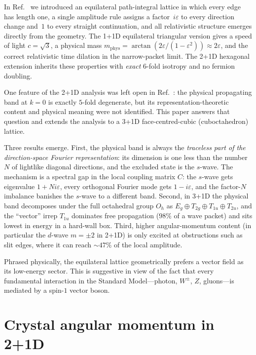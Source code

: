 \documentclass[twocolumn,showpacs,preprintnumbers,amsmath,amssymb]{revtex4-2}
\newcommand{\eps}{\varepsilon}
\newcommand{\mphys}{m_{\mathrm{phys}}}
\newcommand{\Oh}{O_{h}}
\begin{document}
In Ref.~\cite{schmiereck2026} we introduced an equilateral path-integral
lattice in which every edge has length one, a single amplitude rule
assigns a factor~$i\eps$ to every direction change and~$1$ to every straight
continuation, and all relativistic structure emerges directly from the
geometry.
The \mbox{1\!+\!1D} equilateral triangular version gives a speed of light
$c=\sqrt{3}$, a physical mass
$\mphys=\arctan(2\eps/(1-\eps^{2}))\approx 2\eps$, and the correct
relativistic time dilation in the narrow-packet limit.
The \mbox{2\!+\!1D} hexagonal extension inherits these properties with
\emph{exact} $6$-fold isotropy and no fermion doubling.

One feature of the \mbox{2\!+\!1D} analysis was left open in
Ref.~\cite{schmiereck2026}: the physical propagating band at $k=0$ is
exactly $5$-fold degenerate, but its representation-theoretic content and
physical meaning were not identified.
This paper answers that question and extends the analysis to a
\mbox{3\!+\!1D} face-centred-cubic (cuboctahedron) lattice.

Three results emerge.
First, the physical band is always the \emph{traceless part of the
direction-space Fourier representation}: its dimension is one less than
the number~$N$ of lightlike diagonal directions, and the excluded state is
the $s$-wave.
The mechanism is a spectral gap in the local coupling matrix $C$: the
$s$-wave gets eigenvalue $1+Ni\eps$, every orthogonal Fourier mode gets
$1-i\eps$, and the factor-$N$ imbalance banishes the $s$-wave to a
different band.
Second, in \mbox{3\!+\!1D} the physical band decomposes under the full
octahedral group $\Oh$ as
$E_{g}\oplus T_{2g}\oplus T_{1u}\oplus T_{2u}$, and the ``vector'' irrep
$T_{1u}$ dominates free propagation ($98\%$ of a wave packet) and sits
lowest in energy in a hard-wall box.
Third, higher angular-momentum content (in particular the $d$-wave
$m=\pm 2$ in \mbox{2\!+\!1D}) is only excited at obstructions such as slit
edges, where it can reach $\sim\!\!47\%$ of the local amplitude.

Phrased physically, the equilateral lattice geometrically prefers a vector
field as its low-energy sector.
This is suggestive in view of the fact that every fundamental interaction
in the Standard Model---photon, $W^\pm$, $Z$, gluons---is mediated by a
spin-$1$ vector boson.

\section{Crystal angular momentum in 2+1D}
\label{sec:2d}
\end{document}
